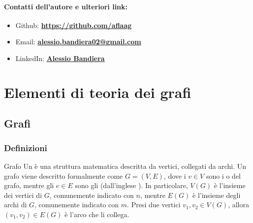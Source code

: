 \documentclass[a4paper, 12pt]{report}
\begin{document}
    \quad

    \subsubsection{Contatti dell'autore e ulteriori link:}
    \begin{itemize}


        \item Github: \textbf{\href{https://github.com/ph04}{https://github.com/aflaag}}
        \item Email: \textbf{\href{mailto:alessio.bandiera02@gmail.com}{alessio.bandiera02@gmail.com}}
        \item LinkedIn: \textbf{\href{https://www.linkedin.com/in/alessio-bandiera-a53767223/}{Alessio Bandiera}}
    \end{itemize}


    \chapter{Elementi di teoria dei grafi}

    \section{Grafi}

    \subsection{Definizioni}

    \begin{frameddefn}{Grafo}
        Un  è una struttura matematica descritta da vertici, collegati da archi. Un grafo viene descritto formalmente come $G=(V, E)$, dove i $v \in V$ sono i  o  del grafo, mentre gli $e \in E$ sono gli  (dall'inglese ). In particolare, $V(G)$ è l'insieme dei vertici di $G$, comunemente indicato con $n$, mentre $E(G)$ è l'insieme degli archi di $G$, comunemente indicato con $m$. Presi due vertici $v_1,v_2 \in V(G)$, allora $(v_1, v_2) \in E(G)$ è l'arco che li collega.
    \end{frameddefn}
\end{document}

